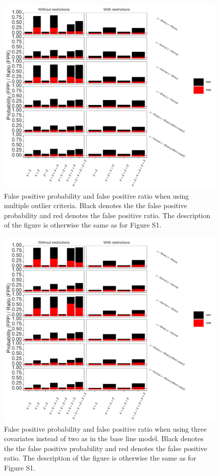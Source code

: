 \begin{figure}[hbt!]
\includegraphics[scale=0.95]{R/Analysis/Result/Figures/Figure1BSI.jpeg}
\centering
\caption{False positive probability and false positive ratio when using multiple outlier criteria. Black denotes the the false positive probability and red denotes the false positive ratio. The description of the figure is otherwise the same as for Figure S1.
}
\label{fig:mainfigure}
\end{figure}

\begin{figure}[hbt!]
\includegraphics[scale=0.95]{R/Analysis/Result/Figures/Figure1CSI.jpeg}
\centering
\caption{False positive probability and false positive ratio when using three covariates instead of two as in the base line model. Black denotes the the false positive probability and red denotes the false positive ratio. The description of the figure is otherwise the same as for Figure S1.
}
\label{fig:mainfigure}
\end{figure}


